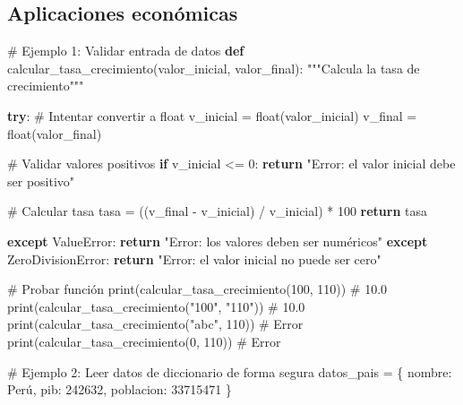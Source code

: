 \documentclass[
  doc,
  floatsintext,
  longtable,
  a4paper,
  nolmodern,
  notxfonts,
  notimes,
  12pt,
  colorlinks=true,linkcolor=blue,citecolor=blue,urlcolor=blue]{apa7}
\newenvironment{Shaded}{\begin{snugshade}}{\end{snugshade}}
\newcommand{\BuiltInTok}[1]{\textcolor[rgb]{0.00,0.23,0.31}{#1}}
\newcommand{\CommentTok}[1]{\textcolor[rgb]{0.37,0.37,0.37}{#1}}
\newcommand{\ControlFlowTok}[1]{\textcolor[rgb]{0.00,0.23,0.31}{\textbf{#1}}}
\newcommand{\DecValTok}[1]{\textcolor[rgb]{0.68,0.00,0.00}{#1}}
\newcommand{\KeywordTok}[1]{\textcolor[rgb]{0.00,0.23,0.31}{\textbf{#1}}}
\newcommand{\NormalTok}[1]{\textcolor[rgb]{0.00,0.23,0.31}{#1}}
\newcommand{\OperatorTok}[1]{\textcolor[rgb]{0.37,0.37,0.37}{#1}}
\newcommand{\PreprocessorTok}[1]{\textcolor[rgb]{0.68,0.00,0.00}{#1}}
\newcommand{\StringTok}[1]{\textcolor[rgb]{0.13,0.47,0.30}{#1}}
\begin{document}
\subsection{Aplicaciones económicas}\label{aplicaciones-econuxf3micas}

\begin{Shaded}
\begin{Highlighting}[]
\CommentTok{\# Ejemplo 1: Validar entrada de datos}
\KeywordTok{def}\NormalTok{ calcular\_tasa\_crecimiento(valor\_inicial, valor\_final):}
    \CommentTok{"""Calcula la tasa de crecimiento"""}
    
    \ControlFlowTok{try}\NormalTok{:}
        \CommentTok{\# Intentar convertir a float}
\NormalTok{        v\_inicial }\OperatorTok{=} \BuiltInTok{float}\NormalTok{(valor\_inicial)}
\NormalTok{        v\_final }\OperatorTok{=} \BuiltInTok{float}\NormalTok{(valor\_final)}
        
        \CommentTok{\# Validar valores positivos}
        \ControlFlowTok{if}\NormalTok{ v\_inicial }\OperatorTok{\textless{}=} \DecValTok{0}\NormalTok{:}
            \ControlFlowTok{return} \StringTok{"Error: el valor inicial debe ser positivo"}
        
        \CommentTok{\# Calcular tasa}
\NormalTok{        tasa }\OperatorTok{=}\NormalTok{ ((v\_final }\OperatorTok{{-}}\NormalTok{ v\_inicial) }\OperatorTok{/}\NormalTok{ v\_inicial) }\OperatorTok{*} \DecValTok{100}
        \ControlFlowTok{return}\NormalTok{ tasa}
        
    \ControlFlowTok{except} \PreprocessorTok{ValueError}\NormalTok{:}
        \ControlFlowTok{return} \StringTok{"Error: los valores deben ser numéricos"}
    \ControlFlowTok{except} \PreprocessorTok{ZeroDivisionError}\NormalTok{:}
        \ControlFlowTok{return} \StringTok{"Error: el valor inicial no puede ser cero"}

\CommentTok{\# Probar función}
\BuiltInTok{print}\NormalTok{(calcular\_tasa\_crecimiento(}\DecValTok{100}\NormalTok{, }\DecValTok{110}\NormalTok{))      }\CommentTok{\# 10.0}
\BuiltInTok{print}\NormalTok{(calcular\_tasa\_crecimiento(}\StringTok{"100"}\NormalTok{, }\StringTok{"110"}\NormalTok{))  }\CommentTok{\# 10.0}
\BuiltInTok{print}\NormalTok{(calcular\_tasa\_crecimiento(}\StringTok{"abc"}\NormalTok{, }\DecValTok{110}\NormalTok{))    }\CommentTok{\# Error}
\BuiltInTok{print}\NormalTok{(calcular\_tasa\_crecimiento(}\DecValTok{0}\NormalTok{, }\DecValTok{110}\NormalTok{))        }\CommentTok{\# Error}

\CommentTok{\# Ejemplo 2: Leer datos de diccionario de forma segura}
\NormalTok{datos\_pais }\OperatorTok{=}\NormalTok{ \{}
    \StringTok{\textquotesingle{}nombre\textquotesingle{}}\NormalTok{: }\StringTok{\textquotesingle{}Perú\textquotesingle{}}\NormalTok{,}
    \StringTok{\textquotesingle{}pib\textquotesingle{}}\NormalTok{: }\DecValTok{242632}\NormalTok{,}
    \StringTok{\textquotesingle{}poblacion\textquotesingle{}}\NormalTok{: }\DecValTok{33715471}
\NormalTok{\}}


\end{Highlighting}
\end{Shaded}
\end{document}
